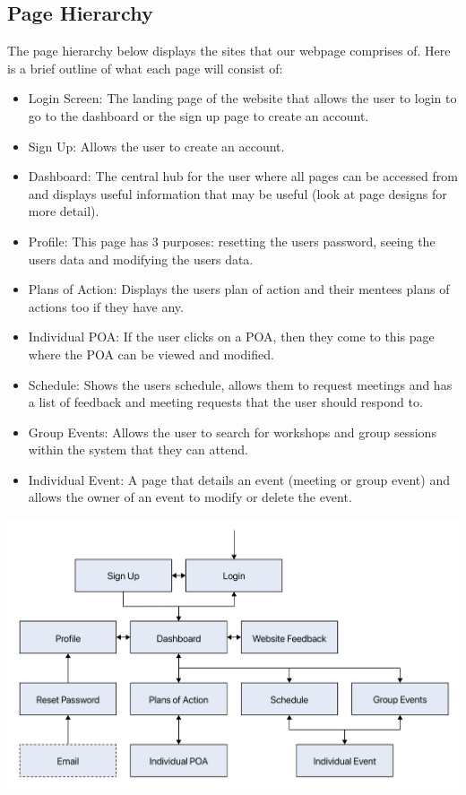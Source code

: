 \documentclass[10pt]{article}
\begin{document}
\subsection{Page Hierarchy}
The page hierarchy below displays the sites that our webpage comprises of. Here
is a brief outline of what each page will consist of: 
\begin{itemize}
    \item Login Screen: The landing page of the website that allows the user to
    login to go to the dashboard or the sign up page to create an account. 
    \item Sign Up: Allows the user to create an account. 
    \item Dashboard: The central hub for the user where all pages can be
    accessed from and displays useful information that may be useful (look at
    page designs for more detail). 
    \item Profile: This page has 3 purposes: resetting the users password,
    seeing the users data and modifying the users data. 
    \item Plans of Action: Displays the users plan of action and their mentees
    plans of actions too if they have any. 
    \item Individual POA: If the user clicks on a POA, then they come to this
    page where the POA can be viewed and modified. 
    \item Schedule: Shows the users schedule, allows them to request meetings
    and has a list of feedback and meeting requests that the user should respond
    to. 
    \item Group Events: Allows the user to search for workshops and group
    sessions within the system that they can attend.
    \item Individual Event: A page that details an event (meeting or group
    event) and allows the owner of an event to modify or delete the event.
\end{itemize}

\includegraphics[scale=0.25]{Hierarchy}
\end{document}
